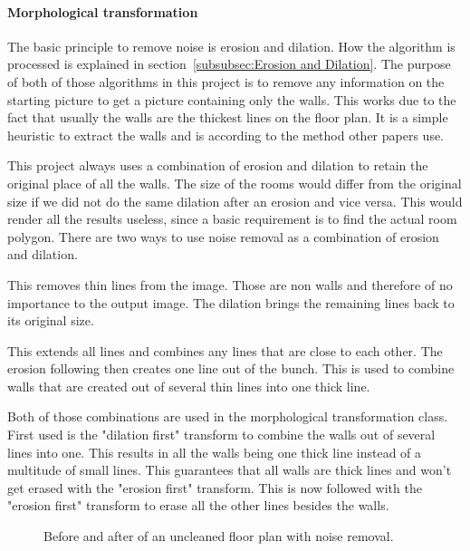 \paragraph{Morphological transformation}
\label{sub:MorphologicalTransformation}

The basic principle to remove noise is erosion and dilation. How the algorithm is processed is explained in section~\ref{subsubsec:Erosion and Dilation}.
The purpose of both of those algorithms in this project is to remove any information on the starting picture to get a picture containing only the walls. This works due to the fact that usually the walls are the thickest lines on the floor plan. It is a simple heuristic to extract the walls and is according to the method other papers use. 

This project always uses a combination of erosion and dilation to retain the original place of all the walls. The size of the rooms would differ from the original size if we did not do the same dilation after an erosion and vice versa. This would render all the results useless, since a basic requirement is to find the actual room polygon. There are two ways to use noise removal as a combination of erosion and dilation. 

\begin{description}[style=nextline]
	\item[Erosion first] This removes thin lines from the image. Those are non walls and therefore of no importance to the output image. The dilation brings the remaining lines back to its original size.
	\item[Dilation first] This extends all lines and combines any lines that are close to each other. The erosion following then creates one line out of the bunch. This is used to combine walls that are created out of several thin lines into one thick line.
\end{description}

Both of those combinations are used in the morphological transformation class. First used is the "dilation first" transform to combine the walls out of several lines into one. This results in all the walls being one thick line instead of a multitude of small lines. This guarantees that all walls are thick lines and won't get erased with the "erosion first" transform. This is now followed with the "erosion first" transform to erase all the other lines besides the walls. 

\begin{figure}[h]
	\centering
	\hfill
	\caption{Before and after of an uncleaned floor plan with noise removal. }
\end{figure}

